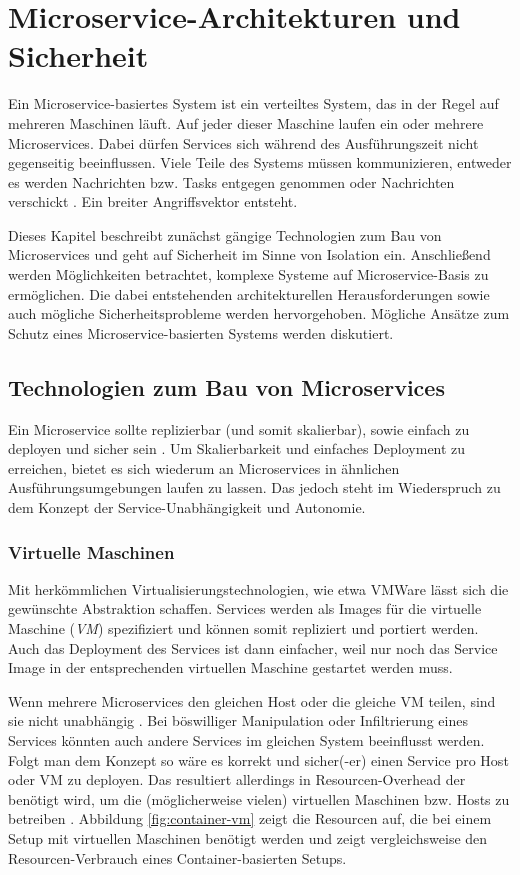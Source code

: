 \section{Microservice-Architekturen und Sicherheit}
\label{sec:ms-arch-sec}

Ein Microservice-basiertes System ist ein verteiltes System, das in der Regel auf mehreren Maschinen läuft. Auf jeder dieser Maschine laufen ein oder mehrere Microservices. Dabei dürfen Services sich während des Ausführungszeit nicht gegenseitig beeinflussen. Viele Teile des Systems müssen kommunizieren, entweder es werden Nachrichten bzw. Tasks entgegen genommen oder Nachrichten verschickt \cite{newman2015}. Ein breiter Angriffsvektor entsteht.

Dieses Kapitel beschreibt zunächst gängige Technologien zum Bau von Microservices und geht auf Sicherheit im Sinne von Isolation ein. Anschließend werden Möglichkeiten betrachtet, komplexe Systeme auf Microservice-Basis zu ermöglichen. Die dabei entstehenden architekturellen Herausforderungen sowie auch mögliche Sicherheitsprobleme werden hervorgehoben. Mögliche Ansätze zum Schutz eines Microservice-basierten Systems werden diskutiert.


\subsection{Technologien zum Bau von Microservices}

Ein Microservice sollte replizierbar (und somit skalierbar), sowie einfach zu deployen und sicher sein \cite{newman2015,microservicesIO}. Um Skalierbarkeit und einfaches Deployment zu erreichen, bietet es sich wiederum an Microservices in ähnlichen Ausführungsumgebungen laufen zu lassen. Das jedoch steht im Wiederspruch zu dem Konzept der Service-Unabhängigkeit und Autonomie. 

\subsubsection{Virtuelle Maschinen}
Mit herkömmlichen Virtualisierungstechnologien, wie etwa VMWare lässt sich die gewünschte Abstraktion schaffen. Services werden als Images für die virtuelle Maschine (\textit{VM}) spezifiziert und können somit repliziert und portiert werden. Auch das Deployment des Services ist dann einfacher, weil nur noch das Service Image in der entsprechenden virtuellen Maschine gestartet werden muss.

Wenn mehrere Microservices den gleichen Host oder die gleiche VM teilen, sind sie nicht unabhängig \cite{microservicesIO}. Bei böswilliger Manipulation oder Infiltrierung eines Services könnten auch andere Services im gleichen System beeinflusst werden. Folgt man dem Konzept so wäre es korrekt und sicher(-er) einen Service pro Host oder VM zu deployen. Das resultiert allerdings in Resourcen-Overhead der benötigt wird, um die (möglicherweise vielen) virtuellen Maschinen bzw. Hosts zu betreiben \cite{newman2015}. Abbildung \ref{fig:container-vm} zeigt die Resourcen auf, die bei einem Setup mit virtuellen Maschinen benötigt werden und zeigt vergleichsweise den Resourcen-Verbrauch eines Container-basierten Setups.

